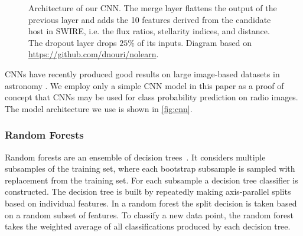 \documentclass[fleqn,usenatbib,usedcolumn]{mnras}
\begin{document}
\begin{figure}
        \caption{Architecture of our CNN. The merge layer flattens the output of
          the previous layer and adds the 10 features derived from the
          candidate host in SWIRE, i.e. the flux ratios, stellarity indices,
          and distance. The dropout layer drops $25\%$ of its
          inputs. Diagram based on \url{
          https://github.com/dnouri/nolearn}.}
        \label{fig:cnn}
      \end{figure}

      CNNs have recently produced good results on large image-based datasets in
      astronomy \citep[e.g.][]{dieleman15cnn, lukic17compact}. We employ only a
      simple CNN model in this paper as a proof of concept that CNNs may be used
      for class probability prediction on radio images. The model architecture
      we use is shown in \autoref{fig:cnn}.

    \subsubsection{Random Forests}
    \label{sec:random-forests}

      Random forests are an ensemble of decision
      trees~\citep{breiman01random-forest}. It considers multiple subsamples
      of the training set, where each bootstrap subsample is sampled with
      replacement from the training set. For each subsample a decision tree
      classifier is constructed. The decision tree is built by repeatedly
      making axis-parallel splits based on individual features. In a random
      forest the split decision is taken based on a random subset of features.
      To classify a new data point, the random forest takes the weighted
      average of all classifications produced by each decision tree.
\end{document}
